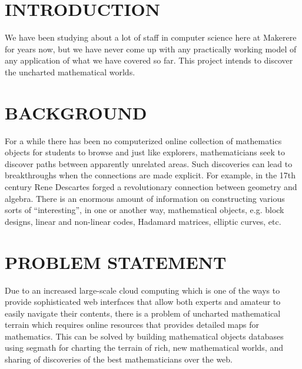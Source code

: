 \documentclass{article}
\begin{document}
\section{INTRODUCTION}\label{sec:intro}
We have been studying about a lot of staff in computer science here at Makerere for years now, but we have never come up with any practically working model of any application of what we have covered so far. This project intends to discover the uncharted mathematical worlds. \\
\section{BACKGROUND}
For a while there has been no computerized online collection of mathematics objects for students to browse and just like explorers, mathematicians seek to discover paths between apparently unrelated areas. Such discoveries can lead to breakthroughs when the connections are made explicit. For example, in the 17th century Rene Descartes forged a revolutionary connection between geometry and algebra. 
There is an enormous amount of information on constructing various sorts of “interesting”, in one or another way, mathematical objects, e.g. block designs, linear and non-linear codes, Hadamard matrices, elliptic curves, etc.\\
\section{PROBLEM STATEMENT}
Due to an increased large-scale cloud computing which is one of the ways to provide sophisticated web interfaces that allow both experts and amateur to easily navigate their contents, there is a problem of uncharted mathematical terrain which requires online resources that provides detailed maps for mathematics. This can be solved by building mathematical objects databases using segmath for charting the terrain of rich, new mathematical worlds, and sharing of discoveries of the best mathematicians over the web.   \\
\end{document}
